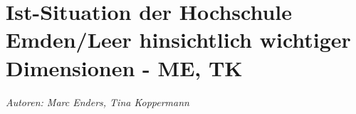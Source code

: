 \chapter{Ist-Situation der Hochschule Emden/Leer hinsichtlich wichtiger Dimensionen - ME, TK}

\textit{Autoren: Marc Enders, Tina Koppermann}








